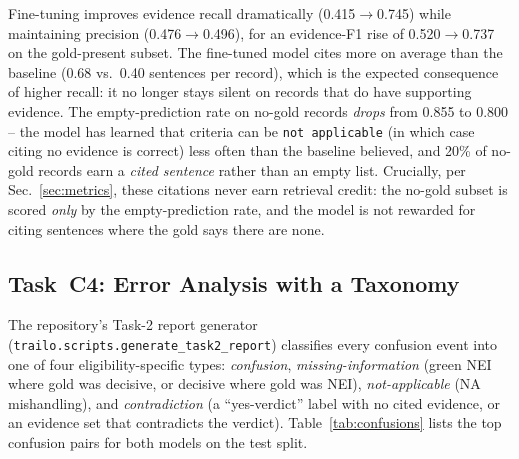 \documentclass[conference]{IEEEtran}
\newcommand{\code}[1]{\texttt{\small #1}}
\begin{document}
Fine-tuning improves evidence recall dramatically
(0.415$\to$0.745) while maintaining precision
(0.476$\to$0.496), for an evidence-F1 rise of 0.520$\to$0.737 on
the gold-present subset. The fine-tuned model cites more on
average than the baseline (0.68 vs.\ 0.40 sentences per record),
which is the expected consequence of higher recall: it no longer
stays silent on records that do have supporting evidence. The
empty-prediction rate on no-gold records \emph{drops} from
0.855 to 0.800 -- the model has learned that criteria can be
\code{not applicable} (in which case citing no evidence is
correct) less often than the baseline believed, and 20\% of
no-gold records earn a \emph{cited sentence} rather than an
empty list. Crucially, per
Sec.~\ref{sec:metrics}, these citations never earn retrieval
credit: the no-gold subset is scored \emph{only} by the
empty-prediction rate, and the model is not rewarded for citing
sentences where the gold says there are none.

\subsection{Task~C4: Error Analysis with a Taxonomy}
\label{sec:errors}

The repository's Task-2 report generator
(\code{trailo.scripts.generate\_task2\_report}) classifies every
confusion event into one of four eligibility-specific types:
\emph{confusion}, \emph{missing-information} (green NEI where gold
was decisive, or decisive where gold was NEI),
\emph{not-applicable} (NA mishandling), and
\emph{contradiction} (a ``yes-verdict'' label with no cited
evidence, or an evidence set that contradicts the verdict).
Table~\ref{tab:confusions} lists the top confusion pairs for both
models on the test split.
\end{document}
